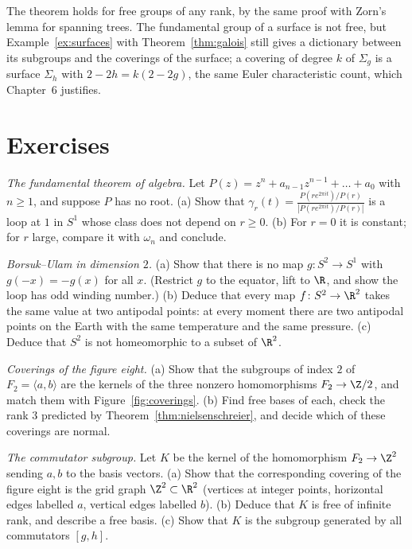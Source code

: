 \begin{remark}
The theorem holds for free groups of any rank, by the same proof with Zorn's lemma for spanning trees. The fundamental group of a surface is not free, but Example~\ref{ex:surfaces} with
Theorem~\ref{thm:galois} still gives a dictionary between its subgroups and the coverings of the surface; a covering of degree $k$ of $\Sigma_g$ is a surface $\Sigma_h$ with $2-2h=k(2-2g)$, the same Euler
characteristic count, which Chapter~6 justifies.
\end{remark}

\section{Exercises}

\begin{exercise}[$\star$]\label{ex:fta}
\emph{The fundamental theorem of algebra.} Let $P(z)=z^n+a_{n-1}z^{n-1}+\dots+a_0$ with $n\ge1$, and suppose $P$ has no root. (a) Show that $\gamma_r(t)=\frac{P(re^{2\pi it})/P(r)}{|P(re^{2\pi it})/P(r)|}$ is a loop at
$1$ in $S^1$ whose class does not depend on $r\ge0$. (b) For $r=0$ it is constant; for $r$ large, compare it with $\omega_n$ and conclude.
\end{exercise}

\begin{exercise}[$\star\star$]\label{ex:borsukulam2}
\emph{Borsuk--Ulam in dimension $2$.} (a) Show that there is no map $g\colon S^2\to S^1$ with $g(-x)=-g(x)$ for all $x$. (Restrict $g$ to the equator, lift to $\R$, and show the loop has odd
winding number.) (b) Deduce that every map $f\colon S^2\to\R^2$ takes the same value at two antipodal points: at every moment there are two antipodal points on the Earth with the same
temperature and the same pressure. (c) Deduce that $S^2$ is not homeomorphic to a subset of $\R^2$.
\end{exercise}

\begin{exercise}[$\star$]\label{ex:figureeight}
\emph{Coverings of the figure eight.} (a) Show that the subgroups of index $2$ of $F_2=\langle a,b\rangle$ are the kernels of the three nonzero homomorphisms $F_2\to\Z/2$, and match them with
Figure~\ref{fig:coverings}. (b) Find free bases of each, check the rank $3$ predicted by Theorem~\ref{thm:nielsenschreier}, and decide which of these coverings are normal.
\end{exercise}

\begin{exercise}[$\star\star$]\label{ex:commutator}
\emph{The commutator subgroup.} Let $K$ be the kernel of the homomorphism $F_2\to\Z^2$ sending $a,b$ to the basis vectors. (a) Show that the corresponding covering of the figure eight is the
grid graph $\Z^2\subset\R^2$ (vertices at integer points, horizontal edges labelled $a$, vertical edges labelled $b$). (b) Deduce that $K$ is free of infinite rank, and describe a free basis. (c) Show that $K$ is the subgroup generated by all commutators $[g,h]$.
\end{exercise}

